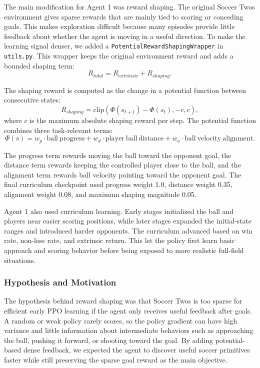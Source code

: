 \documentclass{article}
\begin{document}
The main modification for Agent 1 was reward shaping. The original Soccer Twos environment gives sparse rewards that are mainly tied to scoring or conceding goals. This makes exploration difficult because many episodes provide little feedback about whether the agent is moving in a useful direction. To make the learning signal denser, we added a \texttt{PotentialRewardShapingWrapper} in \texttt{utils.py}. This wrapper keeps the original environment reward and adds a bounded shaping term:
\[
R_{total} = R_{extrinsic} + R_{shaping}.
\]

The shaping reward is computed as the change in a potential function between consecutive states:
\[
R_{shaping} = \mathrm{clip}(\Phi(s_{t+1}) - \Phi(s_t), -c, c),
\]
where $c$ is the maximum absolute shaping reward per step. The potential function combines three task-relevant terms:
\[
\Phi(s) =
w_p \cdot \mathrm{ball\ progress}
+ w_d \cdot \mathrm{player\ ball\ distance}
+ w_a \cdot \mathrm{ball\ velocity\ alignment}.
\]

The progress term rewards moving the ball toward the opponent goal, the distance term rewards keeping the controlled player close to the ball, and the alignment term rewards ball velocity pointing toward the opponent goal. The final curriculum checkpoint used progress weight 1.0, distance weight 0.35, alignment weight 0.08, and maximum shaping magnitude 0.05.

Agent 1 also used curriculum learning. Early stages initialized the ball and players near easier scoring positions, while later stages expanded the initial-state ranges and introduced harder opponents. The curriculum advanced based on win rate, non-loss rate, and extrinsic return. This let the policy first learn basic approach and scoring behavior before being exposed to more realistic full-field situations.

\subsubsection{Hypothesis and Motivation}

The hypothesis behind reward shaping was that Soccer Twos is too sparse for efficient early PPO learning if the agent only receives useful feedback after goals. A random or weak policy rarely scores, so the policy gradient can have high variance and little information about intermediate behaviors such as approaching the ball, pushing it forward, or shooting toward the goal. By adding potential-based dense feedback, we expected the agent to discover useful soccer primitives faster while still preserving the sparse goal reward as the main objective.
\end{document}
